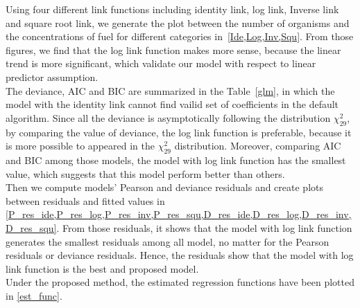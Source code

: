 \documentclass[]{article}
\begin{document}
\begin{enumerate}
{\item[Sol. 4]
Using four different link functions including identity link, log link, Inverse link and square root link, we generate the plot between the number of organisms and the concentrations of fuel for different categories in~\cref{Ide,Log,Inv,Squ}. From those figures, we find that the log link function makes more sense, because the linear trend is more significant, which validate our model with respect to linear predictor assumption.\\
The deviance, AIC and BIC are summarized in the Table~\ref{glm}, in which the model with the identity link cannot find vailid set of coefficients in the default algorithm. Since all the deviance is asymptotically following the distribution $\chi_29^2$, by comparing the value of deviance, the log link function is preferable, because it is more possible to appeared in the $\chi_29^2$ distribution. Moreover, comparing AIC and BIC among those models, the model with log link function has the smallest value, which suggests that this model perform better than others.\\
Then we compute models' Pearson and deviance residuals and create plots between residuals and fitted values in \cref{P_res_ide,P_res_log,P_res_inv,P_res_squ,D_res_ide,D_res_log,D_res_inv,D_res_squ}. From those residuals, it shows that the model with log link function generates the smallest residuals among all model, no matter for the Pearson residuals or deviance residuals. Hence, the residuals show that the model with log link function is the best and proposed model.\\
Under the proposed method, the estimated regression functions have been plotted in \ref{est_func}.

}
\end{enumerate}
\end{document}
